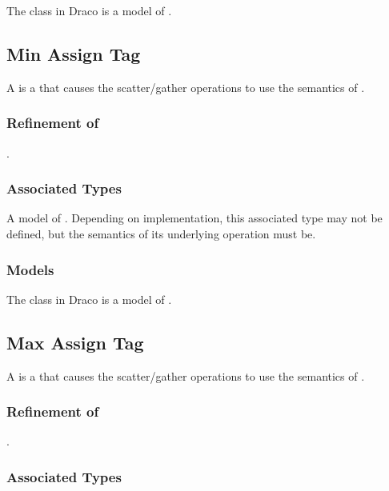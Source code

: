 \documentclass[11pt]{rnote}
\begin{document}
The  class in Draco is a model of
.

\bigskip

\subsection{Min Assign Tag}

A  is a  that
causes the  scatter/gather operations to use
the semantics of .

\subsubsection{Refinement of}
.

\subsubsection{Associated Types}

A model of . Depending on implementation, this
associated type may not be defined, but the semantics of its
underlying operation must be.

\subsubsection{Models}

The  class in Draco is a model of
.

\newpage

\subsection{Max Assign Tag}

A  is a  that
causes the  scatter/gather operations to use
the semantics of .

\subsubsection{Refinement of}
.

\subsubsection{Associated Types}
\end{document}
